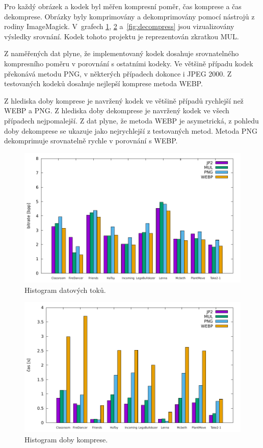 \documentclass[a4paper, 11pt, titlepage]{article}
\begin{document}
	Pro každý obrázek a kodek byl měřen kompresní poměr, čas komprese a čas dekomprese.
	Obrázky byly komprimovány a dekomprimovány pomocí nástrojů z rodiny ImageMagick.
	V~grafech \ref{fig:bitrate}, \ref{fig:compress} a~\ref{fig:decompress} jsou vizualizovány výsledky srovnání.
	Kodek tohoto projektu je reprezentován zkratkou MUL.

	Z naměřených dat plyne, že implementovaný kodek dosahuje srovnatelného kompresního poměru v porovnání s ostatními kodeky.
	Ve většině případu kodek překonává metodu PNG, v některých případech dokonce i JPEG 2000.
	Z testovaných kodeků dosahuje nejlepší komprese metoda WEBP.

	Z hlediska doby komprese je navržený kodek ve většině případů rychlejší než WEBP a PNG.
	Z hlediska doby dekomprese je navržený kodek ve všech případech nejpomalejší.
	Z dat plyne, že metoda WEBP je asymetrická, z pohledu doby dekomprese se ukazuje jako nejrychlejší z testovaných metod.
	Metoda PNG dekomprimuje srovnatelně rychle v porovnání s WEBP.

	\begin{figure}[h!]
	\centering
	\includegraphics[width=15cm]{bitrate.pdf}
	\caption{Histogram datových toků.}
	\label{fig:bitrate}
	\end{figure}

	\begin{figure}[h!]
	\centering
	\includegraphics[width=15cm]{compress_time.pdf}
	\caption{Histogram doby komprese.}
	\label{fig:compress}
	\end{figure}
\end{document}
